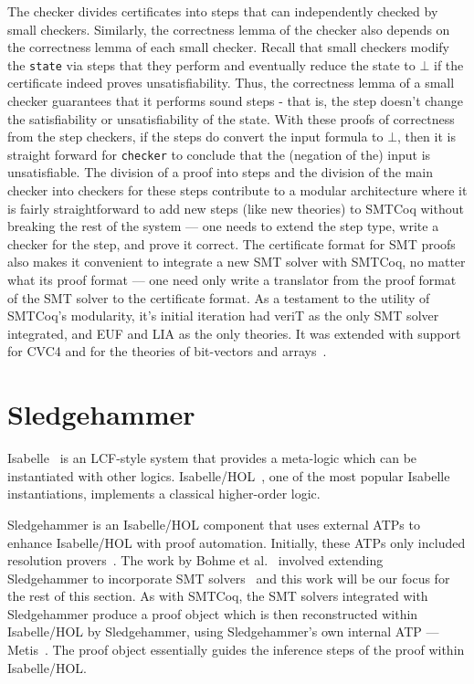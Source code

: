 \documentclass{article}
\begin{document}
	The checker divides certificates
	into steps that can independently 
	checked by small checkers.
	Similarly, the correctness lemma
	of the checker also depends on 
	the correctness lemma of each 
	small checker. Recall that 
	small checkers modify the 
	\texttt{state} via steps that 
	they perform and eventually
	reduce the state to $\bot$ if 
	the certificate indeed proves
	unsatisfiability.  Thus, the 
	correctness lemma of a small 
	checker guarantees that it
	performs sound steps - that is,
	the step doesn't change the 
	satisfiability or unsatisfiability
	of the state. With these proofs
	of correctness from the step 
	checkers, if the steps do 
	convert the input formula 
	to $\bot$, then it is straight
	forward for \texttt{checker}
	to conclude that the 
	(negation of the) input is 
	unsatisfiable. The division 
	of a proof into steps and 
	the division of the main 
	checker into checkers for these
	steps contribute to a 
	modular architecture where it 
	is fairly straightforward to 
	add new steps (like new theories)
	to SMTCoq without breaking 
	the rest of the system --- one 
	needs to extend the step type,
	write a checker for the step, 
	and prove it correct. The 
	certificate format for SMT
	proofs also makes it 
	convenient to integrate a 
	new SMT solver with SMTCoq, 
	no matter what its proof format
	--- one need only write a translator
	from the proof format of the SMT
	solver to the certificate format. 
	As a testament to the utility of
	SMTCoq's modularity, it's 
	initial iteration had veriT as 
	the only SMT solver integrated, 
	and EUF and LIA as the only 
	theories. It was extended 
	with support for CVC4 and 
	for the theories of 
	bit-vectors and 
	arrays~\cite{DBLP:journals/corr/EkiciKKMRT16}.
	
	
	\section{Sledgehammer}
	\label{sec:hammer}
	Isabelle~\cite{DBLP:journals/corr/cs-LO-9301106} 
	is an LCF-style system that 
	provides a meta-logic which can be 
	instantiated with other logics.
	Isabelle/HOL~\cite{10.5555/1791547}, 
	one of the most popular Isabelle 
	instantiations, implements a 
	classical higher-order logic. 
	
	Sledgehammer is
	an Isabelle/HOL component that 
	uses external ATPs to enhance 
	Isabelle/HOL with proof 
	automation. Initially, these 
	ATPs only included resolution 
	provers~\cite{10.1007/978-3-642-39799-8_1}.
	The work by Bohme et 
	al.~\cite{bohme} involved 
	extending Sledgehammer to 
	incorporate SMT
	solvers~\cite{Barrett2018} and this 
	work will be our focus for the 
	rest of this section. As with 
	SMTCoq, the SMT solvers integrated
	with Sledgehammer produce a 
	proof object which is 
	then reconstructed within
	Isabelle/HOL by Sledgehammer, 
	using Sledgehammer's own internal 
	ATP --- Metis~\cite{hurd2003d}. The 
	proof object essentially guides 
	the inference steps of the proof 
	within Isabelle/HOL.
	
\end{document}
